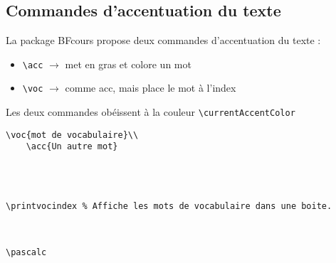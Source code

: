 \subsection{Commandes d'accentuation du texte}

La package BFcours propose deux commandes d'accentuation du texte : 
\begin{itemize}[label = $\bullet$]
    \item \verb+\acc+ $\rightarrow$ met en gras et colore un mot
    \item \verb+\voc+ $\rightarrow$ comme acc, mais place le mot à l'index
\end{itemize}
Les deux commandes obéissent à la couleur \verb+\currentAccentColor+
\begin{tcolorbox}[colback=yellow!10!white, title=Exemple d'utilisation pour \texttt{voc et acc}]
    \begin{minipage}{0.45\textwidth}
    \begin{lstlisting}[breaklines]
    \voc{mot de vocabulaire}\\
    \acc{Un autre mot}
    \end{lstlisting}
    \end{minipage}
    \hfill
    \begin{minipage}{0.45\textwidth}
    \phantom{a}\\
    \\
    \end{minipage}
\end{tcolorbox}

\begin{tcolorbox}[colback=yellow!10!white, title=Exemple d'utilisation pour \texttt{printvocindex}]
    \begin{minipage}{0.45\textwidth}
        \begin{lstlisting}[breaklines]
        \printvocindex % Affiche les mots de vocabulaire dans une boite.
        \end{lstlisting}
        \end{minipage}
        \hfill
        \begin{minipage}{0.45\textwidth}
        \phantom{a}\\
        \printvocindex
    \end{minipage}
\end{tcolorbox}   

\begin{tcolorbox}[colback=yellow!10!white, title=Exemple d'utilisation pour \texttt{newcommand}]
\begin{minipage}{0.45\textwidth}
\begin{lstlisting}[breaklines]
\pascalc
\end{lstlisting}
\end{minipage}
\hfill
\begin{minipage}{0.45\textwidth}
\phantom{a}\\
\pascalc
\end{minipage}
\end{tcolorbox}


